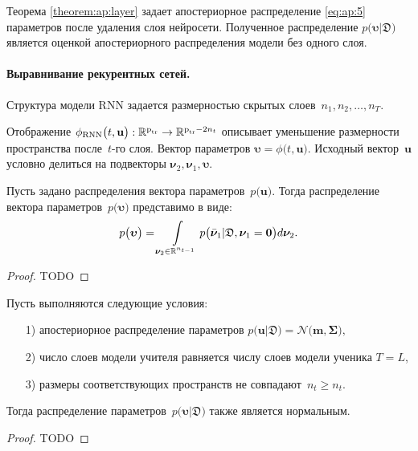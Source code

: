 Теорема \ref{theorem:ap:layer} задает апостериорное распределение \eqref{eq:ap:5} параметров после удаления слоя нейросети. Полученное распределение $p\bigr(\bm{\upsilon}|\mathfrak{D}\bigr) $ является оценкой апостериорного распределения модели без одного слоя.

\paragraph{Выравнивание рекурентных сетей.}

Структура модели RNN задается размерностью скрытых слоев~$n_1, n_2, \ldots, n_T.$

Отображение
$
\setlength\abovedisplayskip{0pt}
\phi_{\text{RNN}}\bigr(t, \mathbf{u}\bigr) : \mathbb{R}^{\text{p}_{\text{tr}}} \to \mathbb{R}^{\text{p}_{\text{tr}}-2n_t}
\setlength\belowdisplayskip{0pt}
$
описывает уменьшение размерности пространства после~$t$-го слоя. Вектор параметров $\bm{\upsilon} =  \phi\bigr(t, \mathbf{u}\bigr).$ Исходный вектор~$\mathbf{u}$ условно делиться на подвекторы $\bm{\nu}_2, {\bm{\nu}}_1, \bm{\upsilon}.$

\begin{theorem}
Пусть задано распределения вектора параметров~$p\bigr(\mathbf{u}\bigr).$ Тогда распределение вектора параметров~$p\bigr(\bm{\upsilon}\bigr)$ представимо в виде:
\[
\setlength\abovedisplayskip{0pt}
p\bigr(\bm{\upsilon}\bigr)  = \int\limits_{ \bm{\nu}_2 \in \mathbb{R}^{n_{t-1}}}p\bigr(\bar{\bm{\nu}}_1|\mathfrak{D}, \bm{\nu}_1=\mathbf{0}\bigr) d \bm{\nu}_2.
\setlength\belowdisplayskip{0pt}
\]
\end{theorem}
\begin{proof}
TODO
\end{proof}

\begin{theorem}
Пусть выполняются следующие условия:
\begin{enumerate}
\item[1)] апостериорное распределение параметров $p\bigr(\mathbf{u}|\mathfrak{D}\bigr) = \mathcal{N}\bigr(\mathbf{m}, \bm{\Sigma}\bigr),$
\item[2)] число слоев модели учителя равняется числу слоев модели ученика $T=L$,
\item[3)] размеры соответствующих пространств не совпадают~$n_t \geq n_t.$
\end{enumerate}
Тогда распределение параметров~$p\bigr(\bm{\upsilon}|\mathfrak{D}\bigr)$ также является нормальным.
\end{theorem}
\begin{proof}
TODO
\end{proof}


